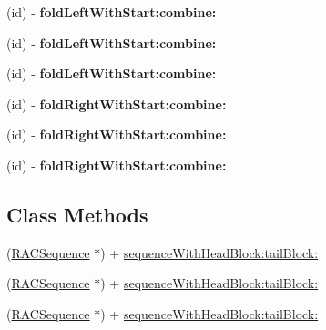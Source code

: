 \begin{DoxyCompactItemize}
\item 
\mbox{\label{interface_r_a_c_sequence_a18bbf2a6860b117a3e8415cd570eb3a1}} 
(id) -\/ {\bfseries fold\+Left\+With\+Start\+:combine\+:}
\item 
\mbox{\label{interface_r_a_c_sequence_a18bbf2a6860b117a3e8415cd570eb3a1}} 
(id) -\/ {\bfseries fold\+Left\+With\+Start\+:combine\+:}
\item 
\mbox{\label{interface_r_a_c_sequence_a18bbf2a6860b117a3e8415cd570eb3a1}} 
(id) -\/ {\bfseries fold\+Left\+With\+Start\+:combine\+:}
\item 
\mbox{\label{interface_r_a_c_sequence_a29fa18ee693d511cfe4c6e5ae7664a6c}} 
(id) -\/ {\bfseries fold\+Right\+With\+Start\+:combine\+:}
\item 
\mbox{\label{interface_r_a_c_sequence_a29fa18ee693d511cfe4c6e5ae7664a6c}} 
(id) -\/ {\bfseries fold\+Right\+With\+Start\+:combine\+:}
\item 
\mbox{\label{interface_r_a_c_sequence_a29fa18ee693d511cfe4c6e5ae7664a6c}} 
(id) -\/ {\bfseries fold\+Right\+With\+Start\+:combine\+:}
\end{DoxyCompactItemize}
\subsection*{Class Methods}
\begin{DoxyCompactItemize}
\item 
(\mbox{\hyperlink{interface_r_a_c_sequence}{R\+A\+C\+Sequence}} $\ast$) + \mbox{\hyperlink{interface_r_a_c_sequence_a20ccbd1419a168a74a10a83dfa88e62e}{sequence\+With\+Head\+Block\+:tail\+Block\+:}}
\item 
(\mbox{\hyperlink{interface_r_a_c_sequence}{R\+A\+C\+Sequence}} $\ast$) + \mbox{\hyperlink{interface_r_a_c_sequence_a20ccbd1419a168a74a10a83dfa88e62e}{sequence\+With\+Head\+Block\+:tail\+Block\+:}}
\item 
(\mbox{\hyperlink{interface_r_a_c_sequence}{R\+A\+C\+Sequence}} $\ast$) + \mbox{\hyperlink{interface_r_a_c_sequence_a20ccbd1419a168a74a10a83dfa88e62e}{sequence\+With\+Head\+Block\+:tail\+Block\+:}}
\end{DoxyCompactItemize}
